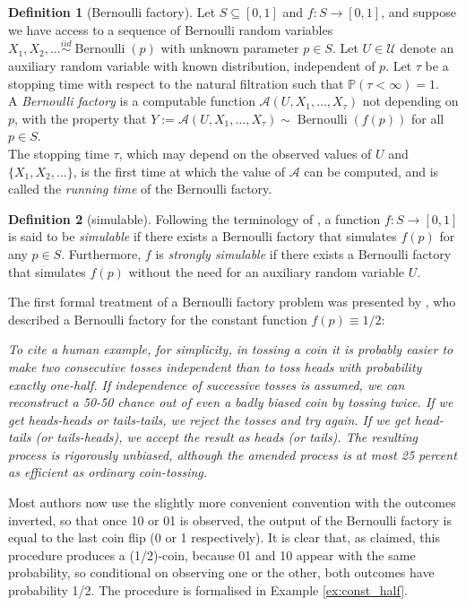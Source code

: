 \documentclass{article}
\theoremstyle{definition}
\newtheorem{defn}{Definition}
\newcommand{\PR}{\mathbb{P}}
\newcommand{\iidsim}{\overset{iid}{\sim}}
\newcommand{\Bern}{\operatorname{Bernoulli}}
\begin{document}
\begin{defn}[Bernoulli factory]\label{defn:BF}
Let $S \subseteq [0,1]$ and $f: S\to[0,1]$, and suppose we have access to a sequence of Bernoulli random variables $X_1,X_2,\dots \iidsim \Bern(p)$ with unknown parameter $p \in S$.
Let $U \in \mathcal{U}$ denote an auxiliary random variable with known distribution, independent of $p$. Let $\tau$ be a stopping time with respect to the natural filtration such that $\PR(\tau<\infty)=1$.\\
A \emph{Bernoulli factory} is a computable function $\mathcal{A}(U, X_1, \dots, X_\tau)$ not depending on $p$, with the property that $Y:=\mathcal{A}(U, X_1, \dots, X_\tau) \sim \Bern(f(p))$ for all $p\in S$.\\
The stopping time $\tau$, which may depend on the observed values of $U$ and $\{X_1, X_2, \dots\}$, is the first time at which the value of $\mathcal{A}$ can be computed, and is called the \emph{running time} of the Bernoulli factory.
\end{defn}

\begin{defn}[simulable]
Following the terminology of \citet{keane1994}, a function $f:S\to[0,1]$ is said to be \emph{simulable} if there exists a Bernoulli factory that simulates $f(p)$ for any $p\in S$.
Furthermore, $f$ is \emph{strongly simulable} if there exists a Bernoulli factory that simulates $f(p)$ without the need for an auxiliary random variable $U$.
\end{defn}

The first formal treatment of a Bernoulli factory problem was presented by \citet{vonneumann1951}, who 
described a Bernoulli factory for the constant function $f(p)\equiv 1/2$:
\begin{displayquote}
\textit{To cite a human example, for simplicity, in tossing a coin it is probably easier to make two consecutive tosses independent than to toss heads with probability exactly one-half. If independence of successive tosses is assumed, we can reconstruct a 50-50 chance out of even a badly biased coin by tossing twice. If we get heads-heads or tails-tails, we reject the tosses and try again. If we get head-tails (or tails-heads), we accept the result as heads (or tails). The resulting process is rigorously unbiased, although the amended process is at most 25 percent as efficient as ordinary coin-tossing.}
\end{displayquote}

Most authors now use the slightly more convenient convention with the outcomes inverted, so that once 10 or 01 is observed, the output of the Bernoulli factory is equal to the last coin flip (0 or 1 respectively). 
It is clear that, as claimed, this procedure produces a (1/2)-coin, because 01 and 10 appear with the same probability, so conditional on observing one or the other, both outcomes have probability 1/2.
The procedure is formalised in Example \ref{ex:const_half}.
\end{document}

